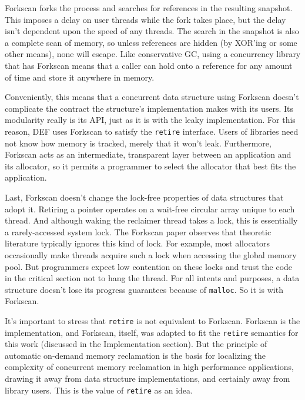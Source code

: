 Forkscan forks the process and searches for references in the resulting snapshot.  This imposes a delay on user threads while the fork takes place, but the delay isn't dependent upon the speed of any threads.  The search in the snapshot is also a complete scan of memory, so unless references are hidden (by XOR'ing or some other means), none will escape.  Like conservative GC, using a concurrency library that has Forkscan means that a caller can hold onto a reference for any amount of time and store it anywhere in memory.

Conveniently, this means that a concurrent data structure using Forkscan doesn't complicate the contract the structure's implementation makes with its users.  Its modularity really is its API, just as it is with the leaky implementation.  For this reason, DEF uses Forkscan to satisfy the \texttt{retire} interface.  Users of libraries need not know how memory is tracked, merely that it won't leak.  Furthermore, Forkscan acts as an intermediate, transparent layer between an application and its allocator, so it permits a programmer to select the allocator that best fits the application.

Last, Forkscan doesn't change the lock-free properties of data structures that adopt it.  Retiring a pointer operates on a wait-free circular array unique to each thread.  And although waking the reclaimer thread takes a lock, this is essentially a rarely-accessed system lock.  The Forkscan paper observes that theoretic literature typically ignores this kind of lock.  For example, most allocators occasionally make threads acquire such a lock when accessing the global memory pool.  But programmers expect low contention on these locks and trust the code in the critical section not to hang the thread.  For all intents and purposes, a data structure doesn't lose its progress guarantees because of \texttt{malloc}.  So it is with Forkscan.

It's important to stress that \texttt{retire} is not equivalent to Forkscan.  Forkscan is the implementation, and Forkscan, itself, was adapted to fit the \texttt{retire} semantics for this work (discussed in the Implementation section).  But the principle of automatic on-demand memory reclamation is the basis for localizing the complexity of concurrent memory reclamation in high performance applications, drawing it away from data structure implementations, and certainly away from library users.  This is the value of \texttt{retire} as an idea.
